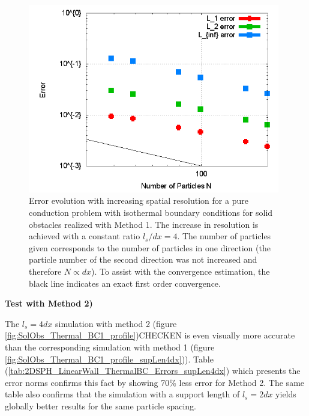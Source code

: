 \documentclass[11pt,a4paper,twoside]{report}
\begin{document}


\begin{figure}[!htbp]
\centering
\label{fig:SolObs_Thermal_BC1_ResolutionError}

\includegraphics[width=11cm]{Graphics/results/Porosities/LinearWall/ThermalBC1_Resolution/ErrorResolution}

\caption[Error resolution ]{Error evolution with increasing spatial resolution for a pure conduction problem with isothermal boundary conditions for solid obstacles realized with Method 1. The increase in resolution is achieved with a constant ratio $l_s/dx=4$.
The number of particles given corresponds to the number of particles in one direction (the particle number of the second direction was not increased and therefore $N \propto dx$). To assist with the convergence estimation, the black line indicates an exact first order convergence.}

\end{figure}
\vspace{1cm}
{\bf Test with Method 2) } 
\linebreak[2]


The $l_s=4dx$ simulation with method 2 (figure \ref{fig:SolObs_Thermal_BC1_profile})CHECKEN is even visually more accurate than the corresponding simulation with method 1 (figure \ref{fig:SolObs_Thermal_BC1_profile_supLen4dx})). Table (\ref{tab:2DSPH_LinearWall_ThermalBC_Errors_supLen4dx}) which presents the error norms confirms this fact by showing 70\% less error for Method 2. The same table also confirms that the simulation with a support length of $l_s=2dx$ yields globally better results for the same particle spacing.
\end{document}
